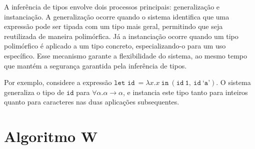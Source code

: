 A inferência de tipos envolve dois processos principais: generalização e instanciação.
A generalização ocorre quando o sistema identifica que uma expressão pode ser tipada com um tipo mais geral, permitindo que seja reutilizada de maneira polimórfica.
Já a instanciação ocorre quando um tipo polimórfico é aplicado a um tipo concreto, especializando-o para um uso específico.
Esse mecanismo garante a flexibilidade do sistema, ao mesmo tempo que mantém a segurança garantida pela inferência de tipos.

Por exemplo, considere a expressão $\texttt{let id} \ = \lambda x.x \ \texttt{in} \ (\texttt{id} \ \texttt{1}, \ \texttt{id} \ \texttt{`a'})$.
O sistema generaliza o tipo de $\texttt{id}$ para $\forall \alpha. \alpha \rightarrow \alpha$, e instancia este tipo tanto para inteiros quanto para caracteres nas duas aplicações subsequentes.




\section{Algoritmo W}\label{sec:w-algo}


